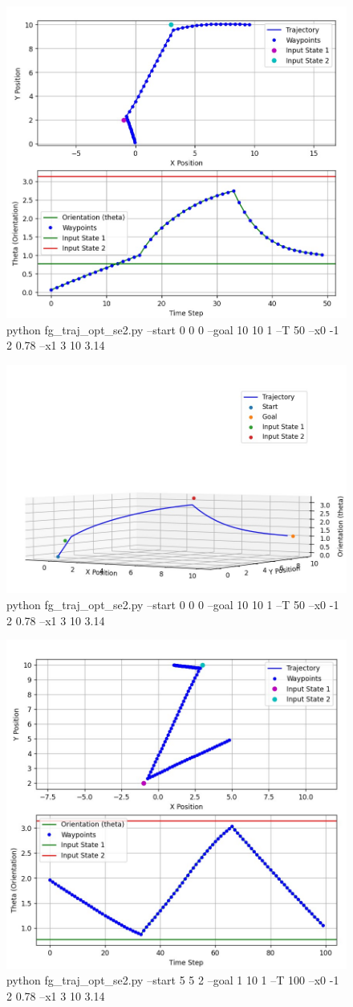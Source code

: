 \documentclass{article}
\begin{document}
\begin{figure} [H]
    \centering
    \includegraphics[width=0.5\linewidth]{latex_media/fg_traj_opt_se2_2.jpg}
    \caption{python fg\_traj\_opt\_se2.py --start 0 0 0 --goal 10 10 1 --T 50 --x0 -1 2 0.78 --x1 3 10 3.14}
    
\end{figure}

\begin{figure} [H]
    \centering
    \includegraphics[width=0.5\linewidth]{latex_media/fg_traj_opt_se2_22.jpg}
    \caption{python fg\_traj\_opt\_se2.py --start 0 0 0 --goal 10 10 1 --T 50 --x0 -1 2 0.78 --x1 3 10 3.14}
    
\end{figure}

\begin{figure} [H]
    \centering
    \includegraphics[width=0.5\linewidth]{latex_media/fg_traj_opt_se2_3.jpg}
    \caption{ python fg\_traj\_opt\_se2.py --start 5 5 2 --goal 1 10 1 --T 100 --x0 -1 2 0.78 --x1 3 10 3.14}
    
\end{figure}
\end{document}
